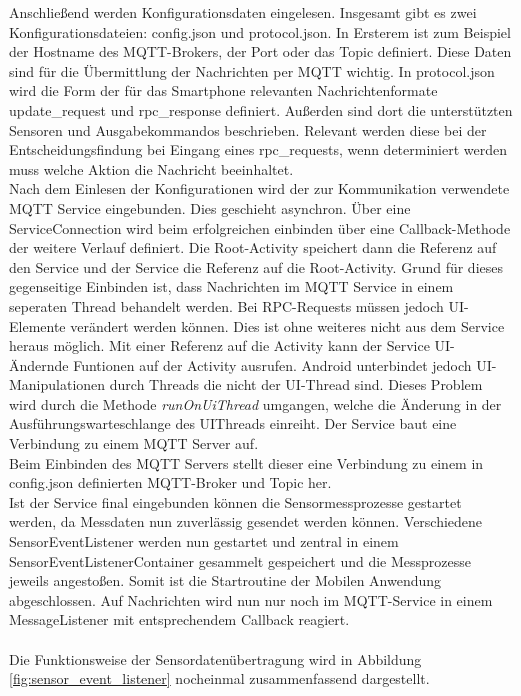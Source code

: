 \documentclass[11pt,a4paper]{report}
\begin{document}
Anschließend werden Konfigurationsdaten eingelesen.
Insgesamt gibt es zwei Konfigurationsdateien: config.json und protocol.json.
In Ersterem ist zum Beispiel der Hostname des MQTT-Brokers, der Port oder das Topic definiert.
Diese Daten sind für die Übermittlung der Nachrichten per MQTT wichtig.
In protocol.json wird die Form der für das Smartphone relevanten Nachrichtenformate update\_request und rpc\_response definiert.
Außerden sind dort die unterstützten Sensoren und Ausgabekommandos beschrieben.
Relevant werden diese bei der Entscheidungsfindung bei Eingang eines rpc\_requests, wenn determiniert werden muss welche Aktion die Nachricht beeinhaltet.
\\
Nach dem Einlesen der Konfigurationen wird der zur Kommunikation verwendete MQTT Service eingebunden.
Dies geschieht asynchron.
Über eine ServiceConnection wird beim erfolgreichen einbinden über eine Callback-Methode der weitere Verlauf definiert.
Die Root-Activity speichert dann die Referenz auf den Service und der Service die Referenz auf die Root-Activity.
Grund für dieses gegenseitige Einbinden ist, dass Nachrichten im MQTT Service in einem seperaten Thread behandelt werden.
Bei RPC-Requests müssen jedoch UI-Elemente verändert werden können.
Dies ist ohne weiteres nicht aus dem Service heraus möglich.
Mit einer Referenz auf die Activity kann der Service UI-Ändernde Funtionen auf der Activity ausrufen.
Android unterbindet jedoch UI-Manipulationen durch Threads die nicht der UI-Thread sind.
Dieses Problem wird durch die Methode \textit{runOnUiThread} umgangen, welche die Änderung in der Ausführungswarteschlange des UIThreads einreiht.
Der Service baut eine Verbindung zu einem MQTT Server auf.
\\
Beim Einbinden des MQTT Servers stellt dieser eine Verbindung zu einem in config.json definierten MQTT-Broker und Topic her.
\\
Ist der Service final eingebunden können die Sensormessprozesse gestartet werden, da Messdaten nun zuverlässig gesendet werden können.
Verschiedene SensorEventListener werden nun gestartet und zentral in einem SensorEventListenerContainer gesammelt gespeichert und die Messprozesse jeweils angestoßen.
Somit ist die Startroutine der Mobilen Anwendung abgeschlossen.
Auf Nachrichten wird nun nur noch im MQTT-Service in einem MessageListener mit entsprechendem Callback reagiert.
\\\\
Die Funktionsweise der Sensordatenübertragung wird in Abbildung \ref{fig:sensor_event_listener} nocheinmal zusammenfassend dargestellt.
\end{document}
